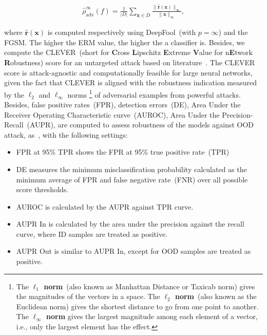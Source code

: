 \vspace{-4mm}
\begin{align}
    \hat{\rho}_{\mathrm{adv}}^{\infty}(f)=\frac{1}{|D|} \sum_{\boldsymbol{x} \in D} \frac{\|\hat{\boldsymbol{r}}(\boldsymbol{x})\|
    _{\infty}}{\|\boldsymbol{x}\|_{\infty}},
\end{align}

\hspace*{3.5mm} where $\hat{\boldsymbol{r}}(\boldsymbol{x})$ is computed respectively using DeepFool~(with $p=\infty$) and the FGSM. The higher the ERM value, the higher the a classifier is. Besides, we compute the CLEVER~(short for \textbf{C}ross \textbf{L}ipschitz \textbf{E}xtreme \textbf{V}alue for n\textbf{E}twork \textbf{R}obustness) score for an untargeted attack based on literature~\cite{weng2018evaluating}. 
The CLEVER score is attack-agnostic and computationally feasible for large neural networks, given the fact that CLEVER is aligned with the robustness indication measured by the $\ell_{2}$ and $\ell_{\infty}$ norms \footnote{The \textbf{$\ell_{1}$ norm}~(also known as Manhattan Distance or Taxicab norm) gives the magnitudes of the vectors in a space. The \textbf{$\ell_{2}$ norm}~(also known as the Euclidean norm) gives the shortest distance to go from one point to another. The \textbf{$\ell_{\infty}$ norm} gives the largest magnitude among each element of a vector, i.e., only the largest element has the effect.} of adversarial examples from powerful attacks. 
Besides, false positive rates~(FPR), detection errors~(DE), Area Under the Receiver Operating Characteristic curve~(AUROC), Area Under the Precision-Recall~(AUPR), are computed to assess robustness of the models against OOD attack, as~\cite{OOD19,OOD18}, with the following settings: 

\vspace{-2mm}
\begin{itemize}[noitemsep]
    \item FPR at 95\% TPR shows the FPR at 95\% true positive rate~(TPR)
    \item DE measures the minimum misclassification probability calculated as the minimum average of FPR and false negative rate~(FNR) over all possible score thresholds.
    \item AUROC is calculated by the AUPR against TPR curve.
    \item AUPR In is calculated by the area under the precision against the recall curve, where ID samples are treated as positive.
    \item AUPR Out is similar to AUPR In, except for OOD samples are treated as positive. 
\end{itemize}

